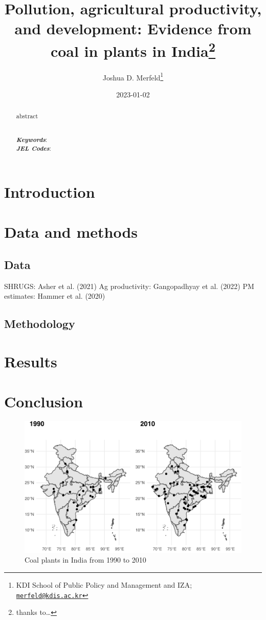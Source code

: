\documentclass[
]{article}
\title{Pollution, agricultural productivity, and development: Evidence from coal in plants in India\footnote{thanks to\ldots{}}}
\author{Joshua D. Merfeld\footnote{KDI School of Public Policy and Management and IZA; \href{mailto:merfeld@kdis.ac.kr}{\nolinkurl{merfeld@kdis.ac.kr}}}}
\date{2023-01-02}
\begin{document}
\maketitle
\begin{abstract}
\noindent abstract\\
\strut \\
\textbf{\textit{Keywords}}:\\
\textbf{\textit{JEL Codes}}:
\end{abstract}

\newpage

\hypertarget{introduction}{%
\section{Introduction}\label{introduction}}

\hypertarget{data-and-methods}{%
\section{Data and methods}\label{data-and-methods}}

\hypertarget{data}{%
\subsection{Data}\label{data}}

SHRUGS: Asher et al. (2021)
Ag productivity: Gangopadhyay et al. (2022)
PM estimates: Hammer et al. (2020)

\hypertarget{methodology}{%
\subsection{Methodology}\label{methodology}}

\hypertarget{results}{%
\section{Results}\label{results}}

\hypertarget{conclusion}{%
\section{Conclusion}\label{conclusion}}

\begin{figure}
\centering
\includegraphics{draft_files/figure-latex/plants-1.pdf}
\caption{\label{fig:plants}Coal plants in India from 1990 to 2010}
\end{figure}
\end{document}
